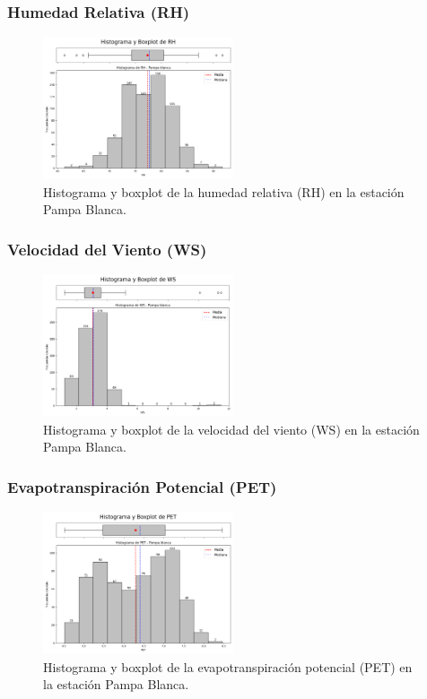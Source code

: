 \subsubsection*{Humedad Relativa (RH)}
\begin{figure}[H]
\centering
\includegraphics[width=0.5\textwidth]{resultados/por_estacion_meteorologica/Pampa_Blanca/RH_histograma.png}
\caption{Histograma y boxplot de la humedad relativa (RH) en la estación Pampa Blanca.}
\label{fig:pampablanca_RH}
\end{figure}

\subsubsection*{Velocidad del Viento (WS)}
\begin{figure}[H]
\centering
\includegraphics[width=0.5\textwidth]{resultados/por_estacion_meteorologica/Pampa_Blanca/WS_histograma.png}
\caption{Histograma y boxplot de la velocidad del viento (WS) en la estación Pampa Blanca.}
\label{fig:pampablanca_WS}
\end{figure}

\subsubsection*{Evapotranspiración Potencial (PET)}
\begin{figure}[H]
\centering
\includegraphics[width=0.5\textwidth]{resultados/por_estacion_meteorologica/Pampa_Blanca/PET_histograma.png}
\caption{Histograma y boxplot de la evapotranspiración potencial (PET) en la estación Pampa Blanca.}
\label{fig:pampablanca_PET}
\end{figure}


